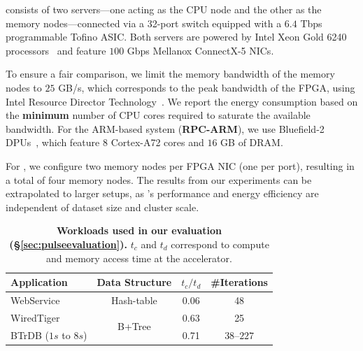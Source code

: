 consists of two servers—one acting as the CPU node and the other as the memory nodes—connected via a 32-port switch equipped with a $6.4$ Tbps programmable Tofino ASIC. Both servers are powered by Intel Xeon Gold 6240 processors~\cite{intelprocessor} and feature $100$ Gbps Mellanox ConnectX-5 NICs. 

To ensure a fair comparison, we limit the memory bandwidth of the memory nodes to $25$ GB/s, which corresponds to the peak bandwidth of the FPGA, using Intel Resource Director Technology~\cite{intel_cmt_cat}. We report the energy consumption based on the \textbf{minimum} number of CPU cores required to saturate the available bandwidth. For the ARM-based system (\textbf{RPC-ARM}), we use Bluefield-2 DPUs~\cite{bluefield}, which feature $8$ Cortex-A72 cores and $16$ GB of DRAM. 

For \pulse, we configure two memory nodes per FPGA NIC (one per port), resulting in a total of four memory nodes. The results from our experiments can be extrapolated to larger setups, as \pulse's performance and energy efficiency are independent of dataset size and cluster scale.


\begin{table}[!t]
  \centering
  \bgroup
  \small
  \def\arraystretch{0.95}%
  \begin{tabular}{l|c|c|c} 
        \hline
        \textbf{Application} & \textbf{Data Structure} & \textbf{$t_c/t_d$} & \textbf{\#Iterations} \\\hline\hline
        WebService & Hash-table & 0.06 & 48 \\\hline
        WiredTiger & \multirow{2}{*}{B+Tree} & 0.63 & 25 \\\cline{1-1}\cline{3-4}
        BTrDB ($1s$ to $8s$) & & 0.71 & $38$--$227$ \\\hline
  \end{tabular}
  \egroup
  \caption[Workloads used in our evaluation]{\textbf{Workloads used in our evaluation (\S\ref{sec:pulseevaluation}).} $t_c$ and $t_d$ correspond to compute and memory access time at the \pulse accelerator.} 
  \label{tab:workloads}
\end{table}

